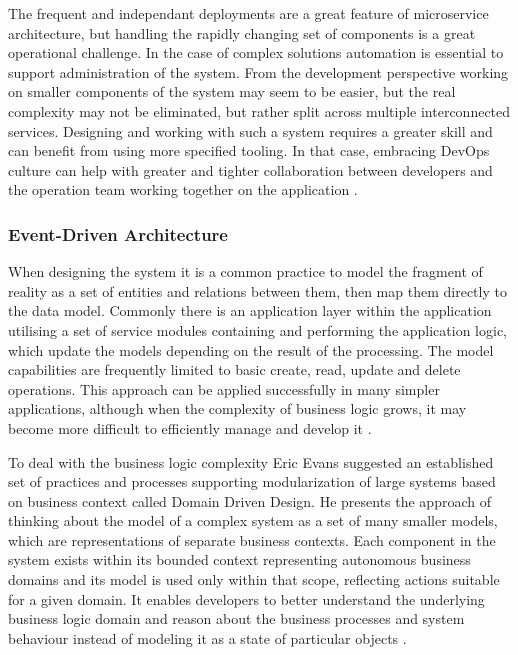 The frequent and independant deployments are a great feature of microservice architecture, but handling the rapidly changing set of components is a great operational challenge. In the case of complex solutions automation is essential to support administration of the system. From the development perspective working on smaller components of the system may seem to be easier, but the real complexity may not be eliminated, but rather split across multiple interconnected services. Designing and working with such a system requires a greater skill and can benefit from using more specified tooling. In that case, embracing DevOps culture can help with greater and tighter collaboration between developers and the operation team working together on the application \cite{FowlerMicroservicesTradeoffs}.

\subsubsection*{Event-Driven Architecture}


When designing the system it is a common practice to model the fragment of reality as a set of entities and relations between them, then map them directly to the data model. Commonly there is an application layer within the application utilising a set of service modules containing and performing the application logic, which update the models depending on the result of the processing. The model capabilities are frequently limited to basic create, read, update and delete operations. This approach can be applied successfully in many simpler applications, although when the complexity of business logic grows, it may become more difficult to efficiently manage and develop it \cite{FowlerAnemicModel}.

To deal with the business logic complexity Eric Evans suggested an established set of practices and processes supporting modularization of large systems based on business context called Domain Driven Design. He presents the approach of thinking about the model of a complex system as a set of many smaller models, which are representations of separate business contexts. Each component in the system exists within its bounded context representing autonomous business domains and its model is used only within that scope, reflecting actions suitable for a given domain. It enables developers to better understand the underlying business logic domain and reason about the business processes and system behaviour instead of modeling it as a state of particular objects \cite{EvansDDD}.

